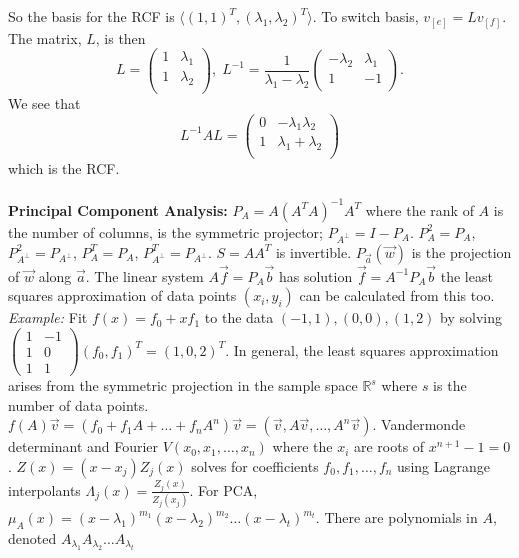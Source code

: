 So the basis for the RCF is $\langle (1,1)^T, (\lambda_1, \lambda_2)^T \rangle$.
To switch basis, $v_{[e]}= L v_{[f]}$.  The matrix, $L$, is then
$$
L=
\left(
\begin{array}{cc}
1 & \lambda_1\\
1 & \lambda_2\\
\end{array}
\right), \;
L^{-1} =
{\frac 1 {\lambda_1 - \lambda_2}}
\left(
\begin{array}{cc}
- \lambda_2 & \lambda_1\\
1 & -1\\
\end{array}
\right).
$$
We see that
$$
L^{-1} A L =
\left(
\begin{array}{cc}
0 & -\lambda_1 \lambda_2\\
1 & \lambda_1 +\lambda_2\\
\end{array}
\right)
$$ which is the RCF.
\\
\\
{\bf Principal Component Analysis:}
$P_A= A(A^TA)^{-1} A^T$ where the rank of $A$ is the number of columns, is the symmetric
projector; $P_{A^{\perp}}= I-P_A$. 
$P_A^2 = P_A$, $P_{A^{\perp}}^2 = P_{A^{\perp}}$,
$P_A^T = P_A$, $P_{A^{\perp}}^T = P_{A^{\perp}}$.  $S=A A^T$ is invertible.
$P_{\vec a} ({\vec w})$ is the projection of ${\vec w}$ along ${\vec a}$.  The
linear system $A {\vec f} = P_A {\vec b}$ has solution
${\vec f} = A^{-1} P_A {\vec b}$ the least squares approximation of data points
$(x_i,y_i)$ can be calculated from this too.  \emph{Example:} Fit $f(x)= f_0 + x f_1$ to the
data $(-1,1), (0,0), (1,2)$ by solving
$\left(
\begin{array}{cc}
1 & -1 \\
1 & 0 \\
1 & 1 
\end{array}
\right)
(f_0, f_1)^T= (1,0,2)^T
$.  In general, the least squares approximation arises from the symmetric 
projection in the sample space ${\mathbb R}^s$ where $s$ is the number of data points.
$f(A) {\vec v}= (f_0 + f_1 A + \ldots + f_n A^n) {\vec v}=
( {\vec v}, A{\vec v}, \ldots, A^n{\vec v})$.  Vandermonde determinant and Fourier
$V(x_0 , x_1 , \ldots , x_n)$ where the $x_i$ are roots of $x^{n+1}-1=0$.
$Z(x)= (x-x_j) Z_j (x)$ solves for coefficients $f_0 , f_1 , \ldots , f_n$ using
Lagrange interpolants $\Lambda_j(x) = {\frac {Z_j(x)} {Z_j(x_j)}}$.  For PCA,
$\mu_A(x)= 
(x-\lambda_1)^{m_1}
(x-\lambda_2)^{m_2}
\ldots
(x-\lambda_t)^{m_t}
$.  There are polynomials in $A$, denoted $ A_{\lambda_1} A_{\lambda_2} \ldots A_{\lambda_t} $
